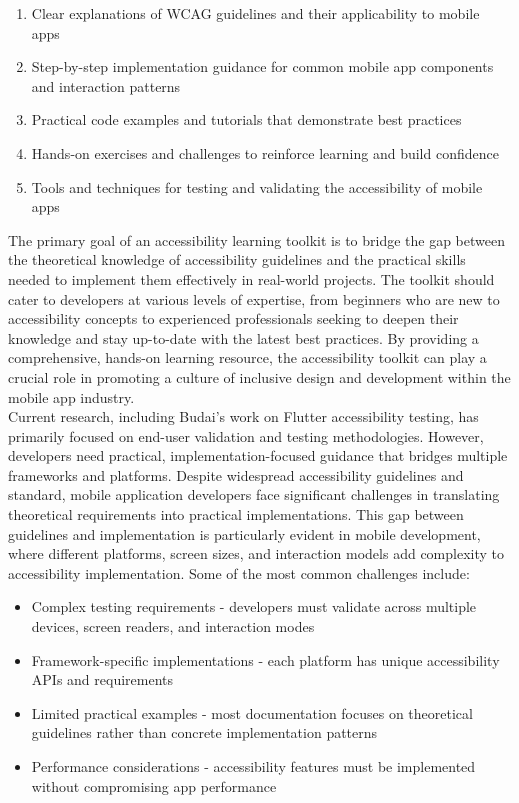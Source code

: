 \begin{enumerate}
    \item Clear explanations of WCAG guidelines and their applicability to mobile apps
    \item Step-by-step implementation guidance for common mobile app components and interaction patterns
    \item Practical code examples and tutorials that demonstrate best practices
    \item Hands-on exercises and challenges to reinforce learning and build confidence
    \item Tools and techniques for testing and validating the accessibility of mobile apps
\end{enumerate}

The primary goal of an accessibility learning toolkit is to bridge the gap between the theoretical knowledge of accessibility guidelines and the practical skills needed to implement them effectively in real-world projects. 
The toolkit should cater to developers at various levels of expertise, from beginners who are new to accessibility concepts to experienced professionals seeking to deepen their knowledge and stay up-to-date with the latest best practices. By providing a comprehensive, hands-on learning resource, the accessibility toolkit can play a crucial role in promoting a culture of inclusive design and development within the mobile app industry. \\

Current research, including Budai's work on Flutter accessibility testing, has primarily focused on end-user validation and testing methodologies. However, developers need practical, implementation-focused guidance that bridges multiple frameworks and platforms.
Despite widespread accessibility guidelines and standard, mobile application developers face significant challenges in translating theoretical requirements into practical implementations. This gap between guidelines and implementation is particularly evident in mobile development, where different platforms, screen sizes, and interaction models add complexity to accessibility implementation. Some of the most common challenges include:

\begin{itemize}
    \item Complex testing requirements - developers must validate across multiple devices, screen readers, and interaction modes
    \item Framework-specific implementations - each platform has unique accessibility APIs and requirements
    \item Limited practical examples - most documentation focuses on theoretical guidelines rather than concrete implementation patterns
    \item Performance considerations - accessibility features must be implemented without compromising app performance
\end{itemize}

